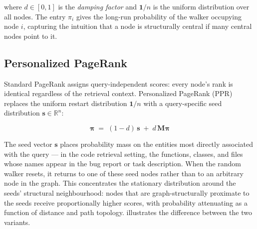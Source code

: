 where $d \in [0, 1]$ is the \emph{damping factor} and $\mathbf{1}/n$ is the uniform
distribution over all nodes.
The entry $\pi_i$ gives the long-run probability of the walker occupying node $i$,
capturing the intuition that a node is structurally central if many central nodes
point to it.

\subsection{Personalized PageRank}
\label{sec:personalized-pagerank}

Standard PageRank assigns query-independent scores: every node's rank is identical
regardless of the retrieval context.
Personalized PageRank (PPR)~\cite{haveliwala2002ppr} replaces the uniform restart
distribution $\mathbf{1}/n$ with a query-specific seed distribution
$\mathbf{s} \in \mathbb{R}^n$:

\begin{equation}
    \boldsymbol{\pi}
    \;=\;
    (1 - d)\,\mathbf{s}
    \;+\;
    d\,\mathbf{M}\boldsymbol{\pi}
    \label{eq:ppr}
\end{equation}

The seed vector $\mathbf{s}$ places probability mass on the entities most directly
associated with the query — in the code retrieval setting, the functions, classes, and
files whose names appear in the bug report or task description.
When the random walker resets, it returns to one of these seed nodes rather than to an
arbitrary node in the graph.
This concentrates the stationary distribution around the seeds' structural neighbourhood:
nodes that are graph-structurally proximate to the seeds receive proportionally higher
scores, with probability attenuating as a function of distance and path topology.
 illustrates the difference between the two variants.

